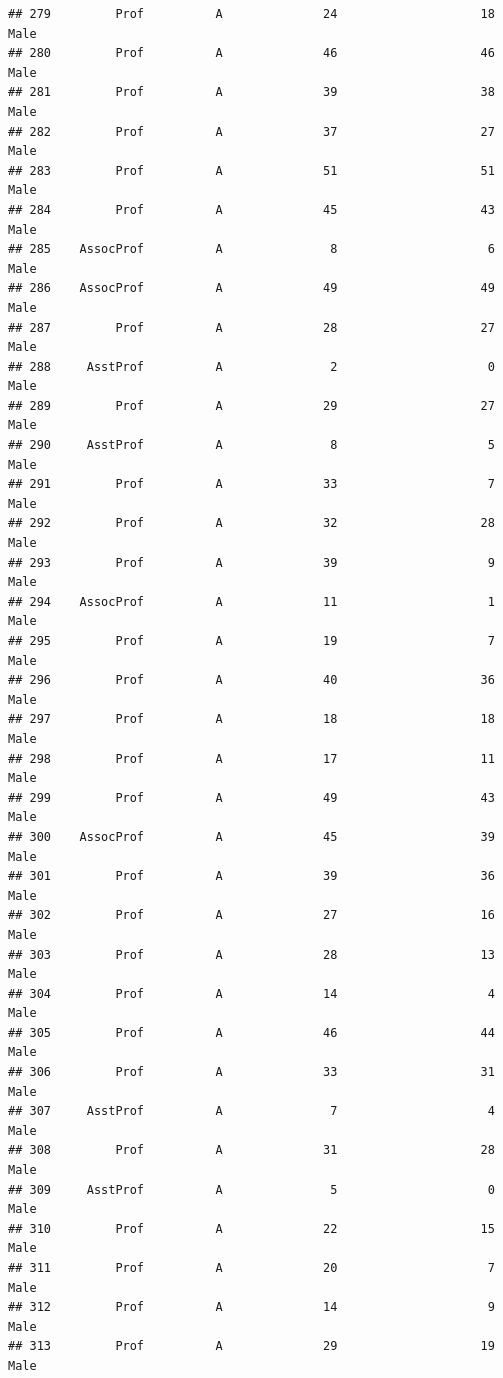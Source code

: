 \documentclass[]{article}
\begin{document}
\begin{verbatim}
## 279         Prof          A              24                    18   Male
## 280         Prof          A              46                    46   Male
## 281         Prof          A              39                    38   Male
## 282         Prof          A              37                    27   Male
## 283         Prof          A              51                    51   Male
## 284         Prof          A              45                    43   Male
## 285    AssocProf          A               8                     6   Male
## 286    AssocProf          A              49                    49   Male
## 287         Prof          A              28                    27   Male
## 288     AsstProf          A               2                     0   Male
## 289         Prof          A              29                    27   Male
## 290     AsstProf          A               8                     5   Male
## 291         Prof          A              33                     7   Male
## 292         Prof          A              32                    28   Male
## 293         Prof          A              39                     9   Male
## 294    AssocProf          A              11                     1   Male
## 295         Prof          A              19                     7   Male
## 296         Prof          A              40                    36   Male
## 297         Prof          A              18                    18   Male
## 298         Prof          A              17                    11   Male
## 299         Prof          A              49                    43   Male
## 300    AssocProf          A              45                    39   Male
## 301         Prof          A              39                    36   Male
## 302         Prof          A              27                    16   Male
## 303         Prof          A              28                    13   Male
## 304         Prof          A              14                     4   Male
## 305         Prof          A              46                    44   Male
## 306         Prof          A              33                    31   Male
## 307     AsstProf          A               7                     4   Male
## 308         Prof          A              31                    28   Male
## 309     AsstProf          A               5                     0   Male
## 310         Prof          A              22                    15   Male
## 311         Prof          A              20                     7   Male
## 312         Prof          A              14                     9   Male
## 313         Prof          A              29                    19   Male

\end{verbatim}
\end{document}
